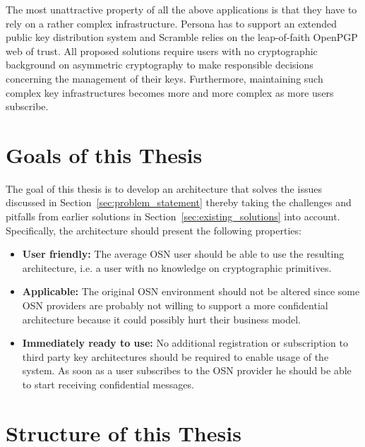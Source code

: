 The most unattractive property of all the above applications is that they have to rely on a rather complex infrastructure. Persona has to support an extended public key distribution system and Scramble relies on the leap-of-faith OpenPGP web of trust. All proposed solutions require users with no cryptographic background on asymmetric cryptography to make responsible decisions concerning the management of their keys. Furthermore, maintaining such complex key infrastructures becomes more and more complex as more users subscribe.

\section{Goals of this Thesis}
\label{sec:goals_of_this_thesis}
The goal of this thesis is to develop an architecture that solves the issues discussed in Section~\ref{sec:problem_statement} thereby taking the challenges and pitfalls from earlier solutions in Section~\ref{sec:existing_solutions} into account. Specifically, the architecture should present the following properties:
\begin{itemize}
 \item \textbf{User friendly:} The average OSN user should be able to use the resulting architecture, i.e. a user with no knowledge on cryptographic primitives.
 \item \textbf{Applicable:} The original OSN environment should not be altered since some OSN providers are probably not willing to support a more confidential architecture because it could possibly hurt their business model.
 \item \textbf{Immediately ready to use:} No additional registration or subscription to third party key architectures should be required to enable usage of the system. As soon as a user subscribes to the OSN provider he should be able to start receiving confidential messages.
\end{itemize}


\section{Structure of this Thesis}

